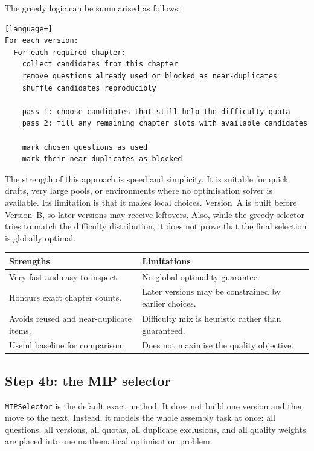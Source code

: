 \documentclass[11pt,a4paper]{article}
\newcommand{\code}[1]{\texttt{\small #1}}
\begin{document}
The greedy logic can be summarised as follows:

\begin{lstlisting}[language=]
For each version:
  For each required chapter:
    collect candidates from this chapter
    remove questions already used or blocked as near-duplicates
    shuffle candidates reproducibly

    pass 1: choose candidates that still help the difficulty quota
    pass 2: fill any remaining chapter slots with available candidates

    mark chosen questions as used
    mark their near-duplicates as blocked
\end{lstlisting}

The strength of this approach is speed and simplicity. It is suitable for quick
drafts, very large pools, or environments where no optimisation solver is
available. Its limitation is that it makes local choices. Version~A is built
before Version~B, so later versions may receive leftovers. Also, while the
greedy selector tries to match the difficulty distribution, it does not prove
that the final selection is globally optimal.

\begin{center}
\begin{tabular}{@{}p{5.7cm}p{6.8cm}@{}}
\toprule
\textbf{Strengths} & \textbf{Limitations} \\
\midrule
Very fast and easy to inspect. & No global optimality guarantee. \\
Honours exact chapter counts. & Later versions may be constrained by earlier choices. \\
Avoids reused and near-duplicate items. & Difficulty mix is heuristic rather than guaranteed. \\
Useful baseline for comparison. & Does not maximise the quality objective. \\
\bottomrule
\end{tabular}
\end{center}

\subsection{Step 4b: the MIP selector}
\label{sec:mip-deep}

\code{MIPSelector} is the default exact method. It does not build one version
and then move to the next. Instead, it models the whole assembly task at once:
all questions, all versions, all quotas, all duplicate exclusions, and all
quality weights are placed into one mathematical optimisation problem.
\end{document}
